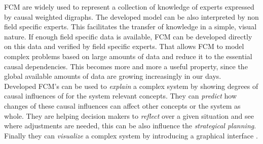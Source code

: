 \documentclass[conference]{IEEEtran}
\begin{document}
FCM are widely used to represent a collection of knowledge of experts expressed by causal weighted digraphs. The developed model can be also interpreted by non field specific experts. This facilitates the transfer of knowledge in a simple, visual nature. If enough field specific data is available, FCM can be developed directly on this data and verified by field specific experts. That allows FCM to model complex problems based on large amounts of data and reduce it to the essential causal dependencies. This becomes more and more a useful property, since the global available amounts of data are growing increasingly in our days.\\
Developed FCM's can be used to \emph{explain} a complex system by showing degrees of causal influences of for the system relevant concepts. They can \emph{predict} how changes of these causal influences can affect other concepts or the system as whole. They are helping decision makers to \emph{reflect} over a given situation and see where adjustments are needed, this can be also influence the \emph{strategical planning}. Finally they can \emph{visualize} a complex system by introducing a graphical interface \cite{papageorgiou2013}.
\end{document}
